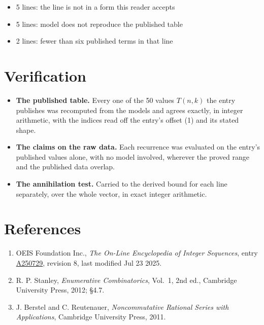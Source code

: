 \documentclass[11pt]{article}
\theoremstyle{definition}
\begin{document}
\begin{itemize}

\item 5 lines: the line is not in a form this reader accepts

\item 5 lines: model does not reproduce the published table

\item 2 lines: fewer than six published terms in that line

\end{itemize}

\section{Verification}

\begin{itemize}

\item {\bfseries The published table.} Every one of the 50 values $T(n,k)$ the entry publishes was recomputed from the models and agrees exactly, in integer arithmetic, with the indices read off the entry's offset (1) and its stated shape.

\item {\bfseries The claims on the raw data.} Each recurrence was evaluated on the entry's published values alone, with no model involved, wherever the proved range and the published data overlap.

\item {\bfseries The annihilation test.} Carried to the derived bound for each line separately, over the whole vector, in exact integer arithmetic.

\end{itemize}

\section{References}

\begin{enumerate}

\item OEIS Foundation Inc., \emph{The On-Line Encyclopedia of Integer Sequences}, entry \href{https://oeis.org/A250729}{A250729}, revision 8, last modified Jul 23 2025.

\item R. P. Stanley, \emph{Enumerative Combinatorics}, Vol.~1, 2nd ed., Cambridge University Press, 2012; \S4.7.

\item J. Berstel and C. Reutenauer, \emph{Noncommutative Rational Series with Applications}, Cambridge University Press, 2011.

\end{enumerate}
\end{document}
